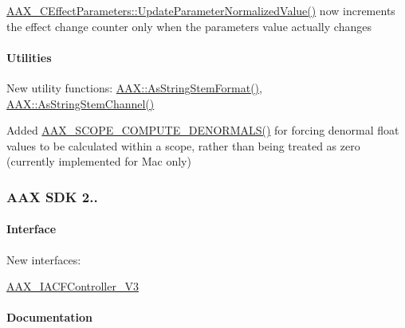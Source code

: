 \begin{DoxyItemize}
\item \mbox{\hyperlink{a01481_aeff79c1e5cc6b65c7ed21d9912f87caf}{A\+A\+X\+\_\+\+C\+Effect\+Parameters\+::\+Update\+Parameter\+Normalized\+Value()}} now increments the effect change counter only when the parameter\textquotesingle{}s value actually changes 
\end{DoxyItemize}\hypertarget{a00847_aax_sdk_2p2p2_Utilities}{}\paragraph{Utilities}\label{a00847_aax_sdk_2p2p2_Utilities}

\begin{DoxyItemize}
\item New utility functions\+: {\ttfamily \mbox{\hyperlink{a00852_a34d219233eb5c9836b837fa2a67150d1}{A\+A\+X\+::\+As\+String\+Stem\+Format()}}}, {\ttfamily \mbox{\hyperlink{a00852_adfab6bf193c09266ecec2069b8da0c5c}{A\+A\+X\+::\+As\+String\+Stem\+Channel()}}}  
\item Added \mbox{\hyperlink{a00755_ad45309abfd0e2faa7a28c9ed753f7806}{A\+A\+X\+\_\+\+S\+C\+O\+P\+E\+\_\+\+C\+O\+M\+P\+U\+T\+E\+\_\+\+D\+E\+N\+O\+R\+M\+A\+L\+S()}} for forcing denormal float values to be calculated within a scope, rather than being treated as zero (currently implemented for Mac only) 
\end{DoxyItemize}\hypertarget{a00847_aax_sdk_2p2p1}{}\subsubsection{A\+A\+X S\+D\+K 2..}\label{a00847_aax_sdk_2p2p1}
\hypertarget{a00847_aax_sdk_2p2p1_Interface}{}\paragraph{Interface}\label{a00847_aax_sdk_2p2p1_Interface}

\begin{DoxyItemize}
\item New interfaces\+: 
\begin{DoxyItemize}
\item \mbox{\hyperlink{a01645}{A\+A\+X\+\_\+\+I\+A\+C\+F\+Controller\+\_\+\+V3}} 
\end{DoxyItemize}
\end{DoxyItemize}\hypertarget{a00847_aax_sdk_2p2p1_Documentation}{}\paragraph{Documentation}\label{a00847_aax_sdk_2p2p1_Documentation}


